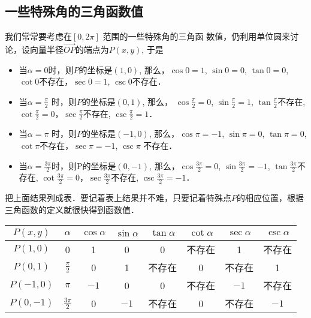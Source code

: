 \subsection{一些特殊角的三角函数值}
我们常常要考虑在$[0,2\pi]$ 范围的一些特殊角的三角函
数值，仍利用单位圆来讨论，设向量半径$\Vec{OP}$的端点为$P(x,y)$, 于是
\begin{itemize}
    \item 当$\alpha =0$时，则$P$的坐标是$(1,0)$, 那么，$\cos0=1$, 
$\sin0=0$, $\tan0=0$, $\cot0$不存在，$\sec 0=1$, $\csc0$不存在．
\item 当$\alpha =\frac{\pi}{2}$
时，则$P$的坐标是$(0,1)$, 那么，
$\cos\frac{\pi}{2}=0$, 
$\sin\frac{\pi}{2}=1$, $\tan\frac{\pi}{2}$不存在, $\cot\frac{\pi}{2}=0$，$\sec \frac{\pi}{2}$不存在, $\csc\frac{\pi}{2}=1$．

\item 当$\alpha =\pi$ 时，则$P$的坐标是$(-1,0)$, 那么，$\cos\pi =-1$, $\sin\pi =0$, $\tan\pi =0$, $\cot\pi$不存在，$\sec \pi =-1$, $\csc\pi$ 不存在．
\item 当$\alpha=\frac{3\pi}{2}$时，则P的坐标是$(0,-1)$, 那么，$\cos\frac{3\pi}{2}=0$, 
$\sin\frac{3\pi}{2}=-1$, $\tan\frac{3\pi}{2}$不存在, $\cot\frac{3\pi}{2}=0$，$\sec \frac{3\pi}{2}$不存在, $\csc\frac{3\pi}{2}=-1$．
\end{itemize}

把上面结果列成表．要记着表上结果并不难，只要记着特殊点$P$的相应位置，根据三角函数的定义就很快得到函数值．
\begin{center}
\begin{tabular}{c|c|cccccc}
\hline
$P(x,y)$ & $\alpha$& $\cos\alpha$& $\sin\alpha$& $\tan\alpha$& $\cot\alpha$& $\sec\alpha$& $\csc\alpha$\\
\hline
$P(1,0)$  &0&1&0&0&不存在&1&不存在\\
$P(0,1)$ &$\frac{\pi}{2}$&0&1&不存在&0&不存在&1\\
$P(-1,0)$ &$\pi$&$-1$&0&0&不存在&$-1$&不存在\\
$P(0,-1)$ &$\frac{3\pi}{2}$&0&$-1$&不存在&0&不存在&$-1$\\
\hline
\end{tabular}
\end{center}

